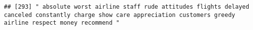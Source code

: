 \documentclass[
]{article}
\begin{document}
\begin{verbatim}
## [293] " absolute worst airline staff rude attitudes flights delayed canceled constantly charge show care appreciation customers greedy airline respect money recommend "                                                                                                                                                                                                                                                                                                                                                                                                                                                                                                                                                                                                                                                                                                                                                                                                                                                                                                                                                                                                                                                                                                                                                                                                                                                                                                                                                                                                                                                                                                                                                                                                                              

\end{verbatim}
\end{document}
